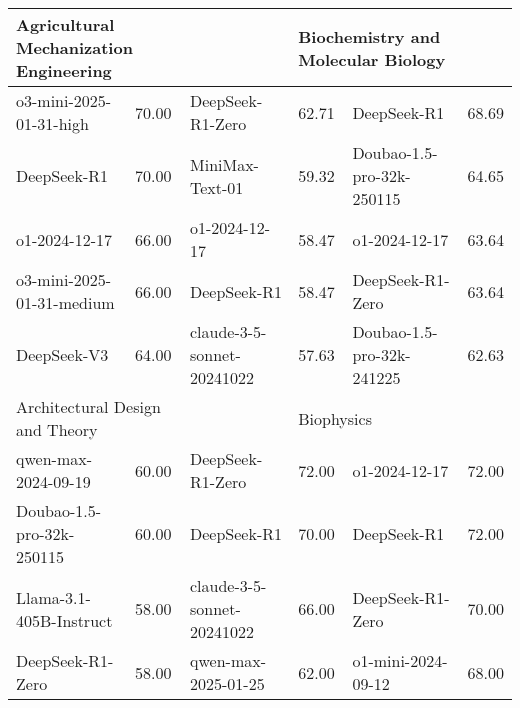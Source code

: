 {\begin{longtable}{p{4.2cm}>{\centering\arraybackslash} p{0.8cm}|p{4.2cm} >{\centering\arraybackslash} p{0.8cm}|p{4.2cm} >{\centering\arraybackslash} p{0.8cm}}
\hline
\multicolumn{2}{p{5.15cm}|}{\cellcolor{blue!10} \centering Agricultural Mechanization Engineering} & \multicolumn{2}{p{5.15cm}|}{\cellcolor{red!10} \centering Civil and Commercial Law} & \multicolumn{2}{p{5.15cm}}{\cellcolor{green!10} \centering Biochemistry and Molecular Biology}\\
\hline
\cellcolor{blue!5} o3-mini-2025-01-31-high & \cellcolor{blue!2}70.00 & \cellcolor{red!5} DeepSeek-R1-Zero & \cellcolor{red!2} 62.71 & \cellcolor{green!5} DeepSeek-R1 & \cellcolor{green!2} 68.69\\
\cellcolor{blue!5} DeepSeek-R1 & \cellcolor{blue!2}70.00 & \cellcolor{red!5} MiniMax-Text-01 & \cellcolor{red!2} 59.32 & \cellcolor{green!5} Doubao-1.5-pro-32k-250115 & \cellcolor{green!2} 64.65\\
\cellcolor{blue!5} o1-2024-12-17 & \cellcolor{blue!2}66.00 & \cellcolor{red!5} o1-2024-12-17 & \cellcolor{red!2} 58.47 & \cellcolor{green!5} o1-2024-12-17 & \cellcolor{green!2} 63.64\\
\cellcolor{blue!5} o3-mini-2025-01-31-medium & \cellcolor{blue!2}66.00 & \cellcolor{red!5} DeepSeek-R1 & \cellcolor{red!2} 58.47 & \cellcolor{green!5} DeepSeek-R1-Zero & \cellcolor{green!2} 63.64\\
\cellcolor{blue!5} DeepSeek-V3 & \cellcolor{blue!2}64.00 & \cellcolor{red!5} claude-3-5-sonnet-20241022 & \cellcolor{red!2} 57.63 & \cellcolor{green!5} Doubao-1.5-pro-32k-241225 & \cellcolor{green!2} 62.63\\
\hline
\multicolumn{2}{p{5.15cm}|}{\cellcolor{blue!10} \centering Architectural Design and Theory} & \multicolumn{2}{p{5.15cm}|}{\cellcolor{red!10} \centering Constitutional and Administrative Law} & \multicolumn{2}{p{5.15cm}}{\cellcolor{green!10} \centering Biophysics}\\
\hline
\cellcolor{blue!5} qwen-max-2024-09-19 & \cellcolor{blue!2}60.00 & \cellcolor{red!5} DeepSeek-R1-Zero & \cellcolor{red!2} 72.00 & \cellcolor{green!5} o1-2024-12-17 & \cellcolor{green!2} 72.00\\
\cellcolor{blue!5} Doubao-1.5-pro-32k-250115 & \cellcolor{blue!2}60.00 & \cellcolor{red!5} DeepSeek-R1 & \cellcolor{red!2} 70.00 & \cellcolor{green!5} DeepSeek-R1 & \cellcolor{green!2} 72.00\\
\cellcolor{blue!5} Llama-3.1-405B-Instruct & \cellcolor{blue!2}58.00 & \cellcolor{red!5} claude-3-5-sonnet-20241022 & \cellcolor{red!2} 66.00 & \cellcolor{green!5} DeepSeek-R1-Zero & \cellcolor{green!2} 70.00\\
\cellcolor{blue!5} DeepSeek-R1-Zero & \cellcolor{blue!2}58.00 & \cellcolor{red!5} qwen-max-2025-01-25 & \cellcolor{red!2} 62.00 & \cellcolor{green!5} o1-mini-2024-09-12 & \cellcolor{green!2} 68.00\\

\end{longtable}}
